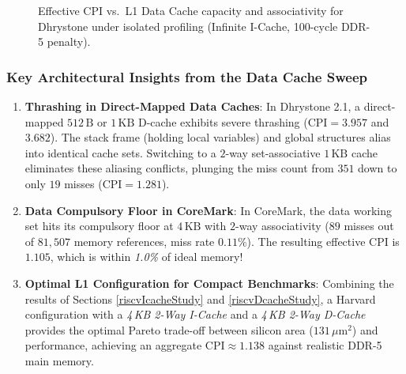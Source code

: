 \begin{figure}[htbp]
\caption{Effective CPI vs.\ L1 Data Cache capacity and associativity for Dhrystone under isolated profiling (Infinite I-Cache, 100-cycle DDR-5 penalty).}\label{fig:riscv_dcache_cpi}
\end{figure}

\subsubsection{Key Architectural Insights from the Data Cache Sweep}
\begin{enumerate}
    \item \textbf{Thrashing in Direct-Mapped Data Caches}: In Dhrystone 2.1, a direct-mapped $512\,\text{B}$ or $1\,\text{KB}$ D-cache exhibits severe thrashing ($\text{CPI} = 3.957$ and $3.682$). The stack frame (holding local variables) and global structures alias into identical cache sets. Switching to a $2$-way set-associative $1\,\text{KB}$ cache eliminates these aliasing conflicts, plunging the miss count from $351$ down to only $19$ misses ($\text{CPI} = 1.281$).
    \item \textbf{Data Compulsory Floor in CoreMark}: In CoreMark, the data working set hits its compulsory floor at $4\,\text{KB}$ with $2$-way associativity ($89$ misses out of $81,507$ memory references, miss rate $0.11\%$). The resulting effective CPI is $1.105$, which is within \textit{1.0\%} of ideal memory!
    \item \textbf{Optimal L1 Configuration for Compact Benchmarks}: Combining the results of Sections \ref{riscvIcacheStudy} and \ref{riscvDcacheStudy}, a Harvard configuration with a \textit{4\,KB 2-Way I-Cache} and a \textit{4\,KB 2-Way D-Cache} provides the optimal Pareto trade-off between silicon area ($131\,\mu\text{m}^2$) and performance, achieving an aggregate $\text{CPI} \approx 1.138$ against realistic DDR-5 main memory.
\end{enumerate}


